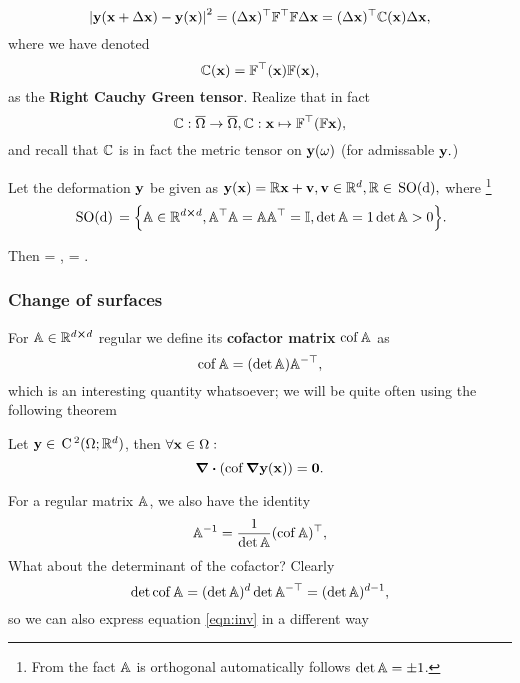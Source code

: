 \documentclass[11pt]{scrartcl} %
\begin{document}
\[
	\abs{\vb{y}(\vb{x}+\Delta \vb{x}) - \vb{y}(\vb{x})}^2 = (\Delta \vb{x})^\top \mathbb{F}^\top \mathbb{F} \Delta \vb{x} = 
	(\Delta \vb{x})^\top \mathbb{C}(\vb{x}) \Delta \vb{x},
\]
where we have denoted
\[
	\mathbb{C}(\vb{x}) = \mathbb{F}^\top(\vb{x})\mathbb{F}(\vb{x}),
\]
as the \textbf{Right Cauchy Green tensor}. Realize that in fact
\[
	\mathbb{C} : \overline{\Omega} \to \overline{\Omega}, \mathbb{C}: \vb{x} \mapsto \mathbb{F}^\top\qty(\mathbb{F} \vb{x}),
\]
and recall that $\mathbb{C}$ is in fact the metric tensor on $\vb{y}\qty(\omega)$ (for admissable $\vb{y}.$)

\begin{example}
	Let the deformation $\vb{y}$ be given as $\vb{y}(\vb{x}) = \mathbb{R} \vb{x}+ \vb{v}, \vb{v} \in {\mathbb R}^d, \mathbb{R} \in \, \text{SO(d)},$ where \footnote{From the fact $\mathbb{A}$ is orthogonal automatically follows $\det \mathbb{A} = \pm 1$.}
	\[
		\, \text{SO(d)} \, = \Big\{\mathbb{A} \in {\mathbb R}^{d \cross d}, \mathbb{A}^\top \mathbb{A} = \mathbb{A} \mathbb{A}^\top = \mathbb{I}, \det \mathbb{A} =1 \det \mathbb{A}>0\Big\}.
	\]
	
	Then \fgrad = , \rcg = \identity.
\end{example}


\subsubsection{Change of surfaces}
\label{sec:chsurfaces}
For $\mathbb{A} \in {\mathbb R}^{d \cross d}$ regular we define its \textbf{cofactor matrix} $\operatorname{cof} \mathbb{A}$ as
\[
	\operatorname{cof} \mathbb{A} = (\det \mathbb{A}) \mathbb{A}^{-\top},
\]
which is an interesting quantity whatsoever; we will be quite often using the following theorem

\begin{theorem}
	Let $\vb{y} \in \, \text{C}\,^2(\Omega;{\mathbb R}^d)$, then $\forall \vb{x}\in \Omega:$
	\[
		\divergence({\cof \grad{\vb{y}(\vb{x})}}) = \vb{0}.
	\]
\end{theorem}
For a regular matrix $\mathbb{A}$, we also have the identity
\begin{equation}
	\label{eqn:inv}
	\mathbb{A}^{-1} = \frac{1}{\det \mathbb{A}} (\operatorname{cof} \mathbb{A})^\top,
\end{equation}
What about the determinant of the cofactor? Clearly
\[
	\det \operatorname{cof} \mathbb{A} = (\det \mathbb{A})^d \det \mathbb{A}^{-\top} = (\det \mathbb{A})^{d-1},
\]
so we can also express equation \ref{eqn:inv} in a different way
\end{document}
